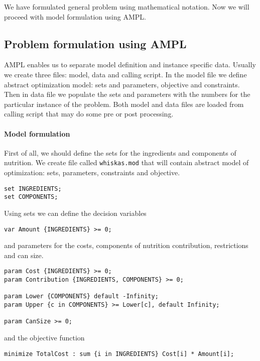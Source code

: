 We have formulated general problem using mathematical notation. Now we will proceed with model formulation using AMPL.

\subsection{Problem formulation using AMPL}

AMPL enables us to separate model definition and instance specific data. Usually we create three files: model, data and calling script. In the model file we define abstract optimization model: sets and parameters, objective and constraints. Then in data file we populate the sets and parameters with the numbers for the particular instance of the problem. Both model and data files are loaded from calling script that may do some pre or post processing.

\paragraph{Model formulation}

First of all, we should define the sets for the ingredients and components of nutrition. We create file called \texttt{whiskas.mod} that will contain abstract model of optimization: sets, parameters, constraints and objective.

\begin{lstlisting}
set INGREDIENTS;
set COMPONENTS;
\end{lstlisting}

Using sets we can define the decision variables
\begin{lstlisting}
var Amount {INGREDIENTS} >= 0;
\end{lstlisting}

and parameters for the costs, components of nutrition contribution, restrictions and can size.

\begin{lstlisting}
param Cost {INGREDIENTS} >= 0;
param Contribution {INGREDIENTS, COMPONENTS} >= 0;

param Lower {COMPONENTS} default -Infinity;
param Upper {c in COMPONENTS} >= Lower[c], default Infinity;

param CanSize >= 0;

\end{lstlisting}

and the objective function

\begin{lstlisting}
minimize TotalCost : sum {i in INGREDIENTS} Cost[i] * Amount[i];
\end{lstlisting}

